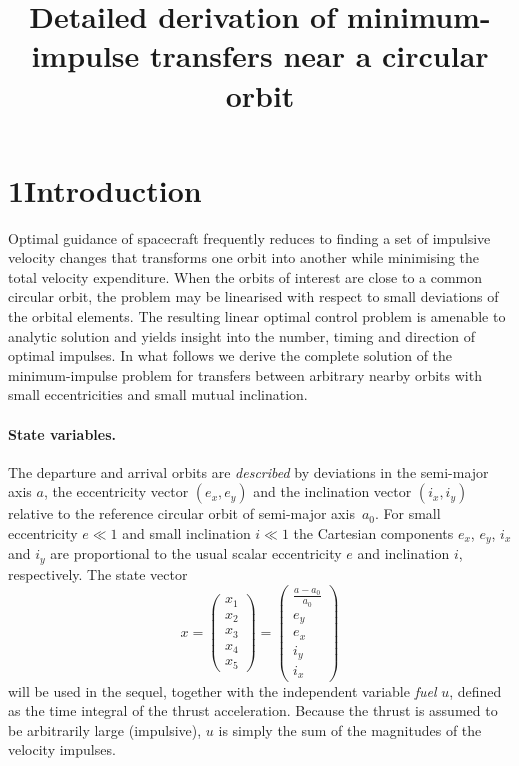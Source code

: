 \documentclass[12pt]{article}
\title{Detailed derivation of minimum-impulse transfers near a circular orbit}
\author{}
\date{}
\begin{document}
\maketitle

\section*{1\quad Introduction}

Optimal guidance of spacecraft frequently reduces to finding a set of
impulsive velocity changes that transforms one orbit into another
while minimising the total velocity expenditure.  When the orbits of
interest are close to a common circular orbit, the problem may be
linearised with respect to small deviations of the orbital elements.
The resulting linear optimal control problem is amenable to analytic
solution and yields insight into the number, timing and direction of
optimal impulses.  In what follows we derive the complete solution of
the minimum-impulse problem for transfers between arbitrary nearby
orbits with small eccentricities and small mutual inclination.

\paragraph{State variables.}  The departure and arrival orbits are
\emph{described} by deviations in the semi-major axis $a$, the eccentricity
vector $(e_x,e_y)$ and the inclination vector $(i_x,i_y)$ relative
to the reference circular orbit of semi-major axis~$a_0$.  For small
eccentricity $e\ll 1$ and small inclination $i\ll 1$ the Cartesian
components $e_x$, $e_y$, $i_x$ and $i_y$ are proportional to the usual
scalar eccentricity $e$ and inclination $i$, respectively.  The
state vector
\[
  x = \begin{pmatrix}
    x_1 \\ x_2 \\ x_3 \\ x_4 \\ x_5
  \end{pmatrix}
  = \begin{pmatrix}
    \displaystyle \frac{a-a_0}{a_0} \\ e_y \\ e_x \\ i_y \\ i_x
  \end{pmatrix}
\]
will be used in the sequel, together with the independent variable
\emph{fuel} $u$, defined as the time integral of the thrust
acceleration.  Because the thrust is assumed to be arbitrarily large
(impulsive), $u$ is simply the sum of the magnitudes of the velocity
impulses.
\end{document}

